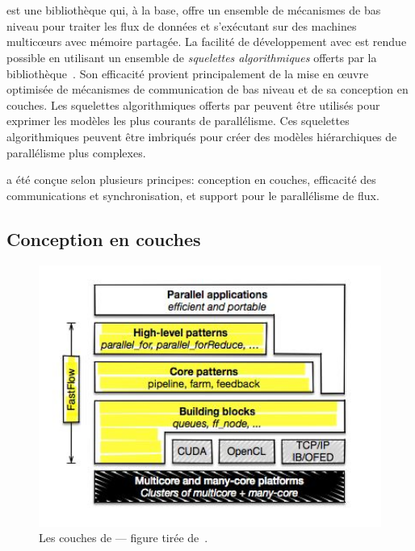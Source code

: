 \section{}
\label{fastflow.sect}

 est une biblioth\`eque  qui, \`a la base, offre un ensemble de m\'ecanismes de bas niveau pour traiter les flux de donn\'ees et s'ex\'ecutant sur des machines multicœurs avec m\'emoire partag\'ee. La facilit\'e de d\'eveloppement avec  est rendue possible en utilisant un ensemble de \emph{squelettes algorithmiques} offerts par la biblioth\`eque~\citep{AldinucciEtAl14}. Son efficacit\'e provient principalement de la mise en œuvre optimis\'ee de m\'ecanismes de communication de bas niveau et de sa conception en couches. Les squelettes algorithmiques offerts par  peuvent \^etre utilis\'es pour exprimer les mod\`eles les plus courants de parall\'elisme. Ces squelettes algorithmiques peuvent \^etre imbriqu\'es pour cr\'eer des mod\`eles hi\'erarchiques de parall\'elisme plus complexes.

 a \'et\'e conçue selon plusieurs principes: conception en couches, efficacit\'e des communications et synchronisation, et support pour le parall\'elisme de flux.

\subsection{Conception en couches}

\begin{figure}
\centering
     \includegraphics[width=1.0\textwidth]{Figures/FastFlowLayers.jpg}
      \caption[Les couches de .]{Les couches de  --- figure tir\'ee de~\citep{Torquati15}.}
       \label{FastFlowLayers.fig}
\end{figure}


